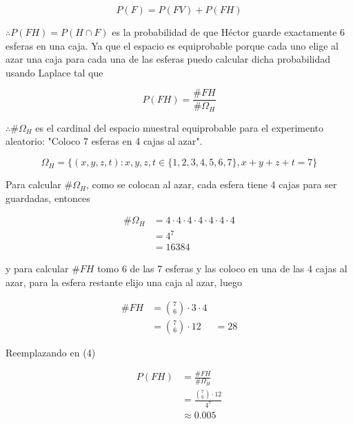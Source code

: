 \documentclass[hidelinks]{article}
\begin{document}
\begin{equation}
    P(F) = P(FV) + P(FH)
\end{equation}

$\therefore P(FH) = P(H \cap F)$ es la probabilidad de que Héctor guarde exactamente 6 esferas en una caja. Ya que el espacio es equiprobable porque cada uno elige al azar una caja para cada una de las esferas puedo calcular dicha probabilidad usando Laplace tal que

\begin{equation}
    P(FH) = \frac{\#FH}{\#\Omega_{H}}
\end{equation}

$\therefore \#\Omega_{H}$ es el cardinal del espacio muestral equiprobable para el experimento aleatorio: "Coloco 7 esferas en 4 cajas al azar".

\begin{equation*}
    \Omega_{H} = \{(x, y, z, t): x, y, z, t \in \{1, 2, 3, 4, 5, 6, 7\}, x + y + z + t = 7\}
\end{equation*}

Para calcular $\#\Omega_{H}$, como se colocan al azar, cada esfera tiene 4 cajas para ser guardadas, entonces

\begin{equation*}
    \begin{aligned}
        \#\Omega_{H} &= 4 \cdot 4 \cdot 4 \cdot 4 \cdot 4 \cdot 4 \cdot 4\\
                     &= 4^{7}\\
                     &= 16384
    \end{aligned}
\end{equation*}

y para calcular $\#FH$ tomo 6 de las 7 esferas y las coloco en una de las 4 cajas al azar, para la esfera restante elijo una caja al azar, luego

\begin{equation*}
    \begin{aligned}
        \#FH &= \binom{7}{6} \cdot 3 \cdot 4\\
             &= \binom{7}{6} \cdot 12
             &= 28
    \end{aligned}
\end{equation*}

Reemplazando en (4)

\begin{equation*}
    \begin{aligned}
        P(FH) &= \frac{\#FH}{\#\Omega_{H}}\\
              &= \frac{\binom{7}{6} \cdot 12}{4^{7}}\\
              &\approx 0.005
    \end{aligned}
\end{equation*}
\end{document}

